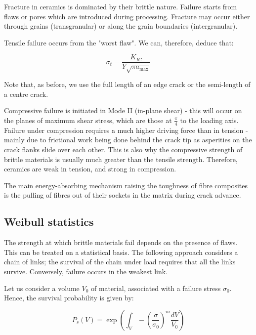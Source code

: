 \documentclass{article}
\begin{document}
\begin{proposition}
    Fracture in ceramics is dominated by their brittle nature. Failure starts from flaws or pores which are introduced during processing. Fracture may occur either through grains (transgranular) or along the grain boundaries (intergranular).

    Tensile failure occurs from the "worst flaw". We can, therefore, deduce that:

    \[ \sigma_t = \frac{K_{IC}}{Y\sqrt{\pi a_{\text{max}}}} \]

    Note that, as before, we use the full length of an edge crack or the semi-length of a centre crack.

    Compressive failure is initiated in Mode II (in-plane shear) - this will occur on the planes of maximum shear stress, which are those at $\frac{\pi}{4}$ to the loading axis. Failure under compression requires a much higher driving force than in tension - mainly due to frictional work being done behind the crack tip as asperities on the crack flanks slide over each other. This is also why the compressive strength of brittle materials is usually much greater than the tensile strength. Therefore, ceramics are weak in tension, and strong in compression.
\end{proposition}

\begin{proposition}
    The main energy-absorbing mechanism raising the toughness of fibre composites is the pulling of fibres out of their sockets in the matrix during crack advance.
\end{proposition}

\subsection{Weibull statistics}

The strength at which brittle materials fail depends on the presence of flaws. This can be treated on a statistical basis. The following approach considers a chain of links; the survival of the chain under load requires that all the links survive. Conversely, failure occurs in the weakest link.

\begin{theorem}
    Let us consider a volume $V_0$ of material, associated with a failure stress $\sigma_0$. Hence, the survival probability is given by:

    \[ P_s(V) = \exp{\left(\int_V - \left(\frac{\sigma}{\sigma_0}\right)^m\frac{dV}{V_0}\right)} \]
\end{theorem}
\end{document}
